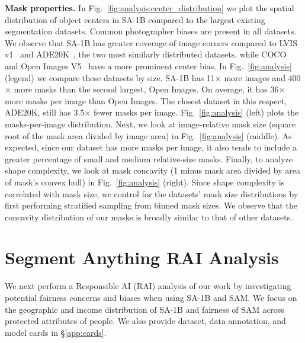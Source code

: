 \textbf{Mask properties.} In Fig.~\ref{fig:analysis:center_distribution} we plot the spatial distribution of object centers in \mbox{SA-1B} compared to the largest existing segmentation datasets. Common photographer biases are present in all datasets. We observe that \mbox{SA-1B} has greater coverage of image corners compared to LVIS v1~\cite{Gupta2019} and ADE20K~\cite{Zhou2019}, the two most similarly distributed datasets, while COCO~\cite{Lin2014} and Open Images V5~\cite{OpenImages} have a more prominent center bias. In Fig.~\ref{fig:analysis} (legend) we compare these datasets by size. \mbox{SA-1B} has 11${\times}$ more images and 400${\times}$ more masks than the second largest, Open Images. On average, it has 36${\times}$ more masks per image than Open Images. The closest dataset in this respect, ADE20K, still has 3.5${\times}$ fewer masks per image. Fig.~\ref{fig:analysis} (left) plots the masks-per-image distribution. Next, we look at image-relative mask size (square root of the mask area divided by image area) in Fig.~\ref{fig:analysis} (middle). As expected, since our dataset has more masks per image, it also tends to include a greater percentage of small and medium relative-size masks. Finally, to analyze shape complexity, we look at mask concavity (1 minus mask area divided by area of mask's convex hull) in Fig.~\ref{fig:analysis} (right). Since shape complexity is correlated with mask size, we control for the datasets' mask size distributions by first performing stratified sampling from binned mask sizes. We observe that the concavity distribution of our masks is broadly similar to that of other datasets.

\section{Segment Anything RAI Analysis}\label{sec:rai}

We next perform a Responsible AI (RAI) analysis of our work by investigating potential fairness concerns and biases when using \mbox{SA-1B} and SAM. We focus on the geographic and income distribution of \mbox{SA-1B} and fairness of SAM across protected attributes of people. We also provide dataset, data annotation, and model cards in \S\ref{app:cards}.

